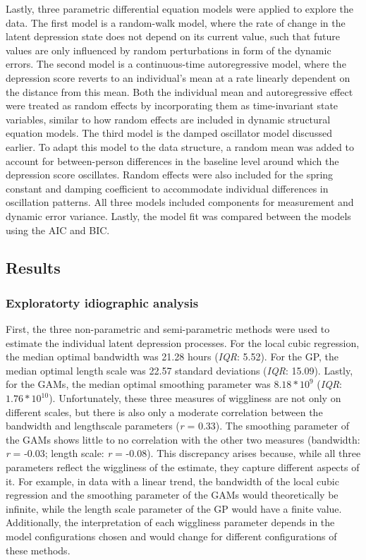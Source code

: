 \documentclass[man, floatsintext]{apa7}
\begin{document}
Lastly, three parametric differential equation models were applied to explore
the data. The first model is a random-walk model, where the rate of change in
the latent depression state does not depend on its current value, such that
future values are only influenced by random perturbations in form of the
dynamic errors.
The second model is a continuous-time autoregressive model, where the
depression score reverts to an individual's mean at a rate linearly dependent
on the distance from this mean. Both the individual mean and autoregressive
effect were treated as random effects by incorporating them as time-invariant
state variables, similar to how random effects are included
in dynamic structural equation models.
The third model is the damped oscillator model discussed earlier. To adapt this
model to the data structure, a random mean was added to account for
between-person differences in the baseline level around which the depression
score oscillates. Random effects were also included for the spring constant
and damping coefficient to accommodate individual differences in oscillation
patterns. All three models included components for measurement and dynamic
error variance. Lastly, the model fit was compared between the models
using the AIC and BIC.

\subsection{Results}

\subsubsection{Exploratorty idiographic analysis}

First, the three non-parametric and semi-parametric methods were used to
estimate the individual latent depression processes. For the local cubic
regression, the median optimal bandwidth was 21.28 hours (\textit{IQR}: 5.52).
For the GP, the median optimal length scale was 22.57 standard deviations
(\textit{IQR}: 15.09). Lastly, for the GAMs, the median optimal smoothing
parameter was $8.18*10^9$ (\textit{IQR}: $1.76*10^{10}$). Unfortunately, these
three measures of wiggliness are not only on different scales, but there is
also only a moderate correlation between the bandwidth and lengthscale
parameters (\textit{r} = 0.33). The smoothing parameter of the GAMs shows
little to no correlation with the other two measures (bandwidth: \textit{r} =
-0.03; length scale: \textit{r} = -0.08). This discrepancy arises because,
while all three parameters reflect the wiggliness of the estimate, they capture
different aspects of it. For example, in data with a linear trend, the
bandwidth of the local cubic regression and the smoothing parameter of the GAMs
would theoretically be infinite, while the length scale parameter of the GP
would have a finite value. Additionally, the interpretation of each
wiggliness parameter depends in the model configurations chosen and would
change for different configurations of these methods.
\end{document}
